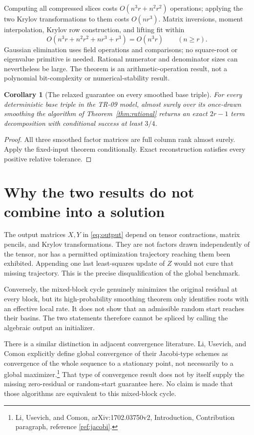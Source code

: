 \documentclass[11pt]{article}
\newtheorem{corollary}[theorem]{Corollary}
\theoremstyle{remark}\newtheorem{remark}[theorem]{Remark}
\begin{document}
Computing all compressed slices costs $O(n^3r+n^2r^2)$ operations; applying the two Krylov transformations to them costs $O(nr^3)$. Matrix inversions, moment interpolation, Krylov row construction, and lifting fit within
\[
 O(n^3r+n^2r^2+nr^3+r^3)=O(n^3r)\qquad(n\ge r).
\]
Gaussian elimination uses field operations and comparisons; no square-root or eigenvalue primitive is needed. Rational numerator and denominator sizes can nevertheless be large. The theorem is an arithmetic-operation result, not a polynomial bit-complexity or numerical-stability result.

\begin{corollary}[The relaxed guarantee on every smoothed base triple]\label{cor:relaxed}
For every deterministic base triple in the TR-09 model, almost surely over its once-drawn smoothing the algorithm of Theorem~\ref{thm:rational} returns an exact $2r-1$ term decomposition with conditional success at least $3/4$.
\end{corollary}
\begin{proof}
All three smoothed factor matrices are full column rank almost surely. Apply the fixed-input theorem conditionally. Exact reconstruction satisfies every positive relative tolerance.
\end{proof}

\section{Why the two results do not combine into a solution}
The output matrices $X,Y$ in \eqref{eq:output} depend on tensor contractions, matrix pencils, and Krylov transformations. They are not factors drawn independently of the tensor, nor has a permitted optimization trajectory reaching them been exhibited. Appending one last least-squares update of $Z$ would not cure that missing trajectory. This is the precise disqualification of the global benchmark.

Conversely, the mixed-block cycle genuinely minimizes the original residual at every block, but its high-probability smoothing theorem only identifies roots with an effective local rate. It does not show that an admissible random start reaches their basins. The two statements therefore cannot be spliced by calling the algebraic output an initializer.

There is a similar distinction in adjacent convergence literature. Li, Usevich, and Comon explicitly define global convergence of their Jacobi-type schemes as convergence of the whole sequence to a stationary point, not necessarily to a global maximizer.\footnote{Li, Usevich, and Comon, arXiv:1702.03750v2, Introduction, Contribution paragraph, reference \ref{ref:jacobi}.} That type of convergence result does not by itself supply the missing zero-residual or random-start guarantee here. No claim is made that those algorithms are equivalent to this mixed-block cycle.
\end{document}
